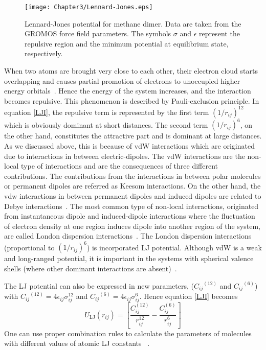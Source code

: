 \begin{figure}[h!]
\centering
\texttt{[image: Chapter3/Lennard-Jones.eps]}
\caption[Lennard-Jones potential for methane dimer.]{Lennard-Jones potential for methane dimer. Data are taken from the GROMOS force field parameters. The symbols $\sigma$ and $\epsilon$ represent the repulsive region and the minimum potential at equilibrium state, respectively.}
\label{lennard}
\end{figure}

When two atoms are brought very close to each other, their electron cloud starts overlapping and causes 
partial promotion of electrons to unoccupied higher energy orbitals~\citep{Kittel2005}. Hence the energy of the system increases, and the interaction becomes repulsive. This phenomenon is described by Pauli-exclusion principle. In equation \ref{LJI}, the repulsive term is represented by the first term $({1}/{r_{ij}})^{12}$ which is obviously dominant at short distances. The second term $({1}/{r_{ij}})^6$, on the other hand, constitutes the attractive part and is dominant at large distances. As we discussed above, this is because of vdW interactions which are originated due to interactions in between electric-dipoles. The vdW interactions are the non-local type of interactions and are the consequences of three different contributions. The contributions from the interactions in between polar molecules or permanent dipoles are referred as Keesom interactions. On the other hand, the vdw interactions in between permanent dipoles and induced dipoles are related to Debye interactions~\citep{Stone1996, Ulman2014}. The most common type of non-local interactions, originated from instantaneous dipole and induced-dipole interactions where the fluctuation of electron density at one region induces dipole into another region of the system, are called London dispersion interactions~\citep{Klime2012}. The London dispersion interactions (proportional to $(1/r_{ij})^6$) is incorporated LJ potential. Although vdW is a weak and long-ranged potential, it is important in the systems with spherical valence shells (where other dominant interactions are absent)~\citep{Leach2001}.

The LJ potential can also be expressed in new parameters, (${C_{ij}}^{(12)}$ and ${C_{ij}}^{(6)}$) 
with ${C_{ij}}^{(12)}= 4\epsilon_{ij} \sigma_{ij}^{12}$ and ${C_{ij}}^{(6)} = 4\epsilon_{ij} \sigma_{ij}^6$. 
Hence equation \ref{LJI} becomes 
\begin{equation}\label{LJ}
U_{\text{LJ}}(r_{ij}) = \left[\frac{C_{ij}^{(12)}}{r_{ij}^{12} } - \frac{C_{ij}^{(6)}}{r_{ij}^6 }\right]
\end{equation}
One can use proper combination rules to calculate the parameters of molecules with different values of atomic LJ constants~ \citep{Gromacs-manual}.

